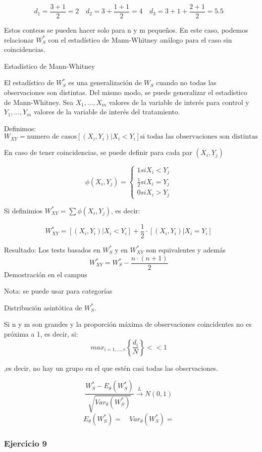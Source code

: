 \[
d_1=\frac{3+1}{2}=2 \quad d_2=3+\frac{1+1}{2}=4 \quad d_3=3+1+\frac{2+1}{2}=5.5
\]

Estos conteos se pueden hacer solo para n y m pequeños. En este caso, podemos relacionar $W_S^*$ con el estadístico de Mann-Whitney análogo para el caso sin coincidencias.

Estadístico de Mann-Whitney

El estadístico de $W_S^*$ es una generalización de $W_S$ cuando no todas las observaciones son distintas.
Del mismo modo, se puede generalizar el estadístico de Mann-Whitney. Sea $X_1,\dots,X_m$ valores de la variable de interés para control y $Y_1,\dots,Y_m$ valores de la variable de interés del tratamiento.

Definimos:
\[
W_{XY}= \text{numero de casos} [(X_i,Y_i)|X_i<Y_i] \text{si todas las observaciones son distintas}
\]

En caso de tener coincidencias, se puede definir para cada par $(X_i,Y_j)$

\[
\phi(X_i,Y_j)=\left\{ 
    \begin{matrix}
        1 si X_i<Y_j \\
        \frac{1}{2} si X_i=Y_j \\
        0 si X_i>Y_j
    \end{matrix}
\right.
\]

Si definimios $W_{XY}^*=\sum \phi (X_i,Y_j)$, es decir:

\[
W_{XY}^* = [(X_i,Y_i)|X_i<Y_i] + \frac{1}{2} \cdot [(X_i,Y_i)|X_i=Y_i]
\]

Resultado: Los tests basados en $W_S^*$ y en $W_{XY}^*$ son equivalentes y además
\[
W_{XY}^*=W_S^*-\frac{n \cdot (n+1)}{2}
\]
Demostración en el campus

Nota: se puede usar para categorías

Distribución asintótica de $W_S^*$.

Si n y m son grandes y la proporción máxima de observaciones coincidentes no es próxima a 1, es decir, si:
\[
max_{i=1,\dots,e}\left\{\frac{d_i}{N} \right\}<<1
\]

,es decir, no hay un grupo en el que estén casi todas las observaciones.

\[
\frac{W_S^*-E_\theta(W_S^*)}{\sqrt{Var_\theta(W_S^*)}} \xrightarrow{L} N(0,1)
\]
\[
E_\theta(W_S^*)= \quad Var_\theta(W_S^*)=
\]

\subsubsection*{Ejercicio 9}

